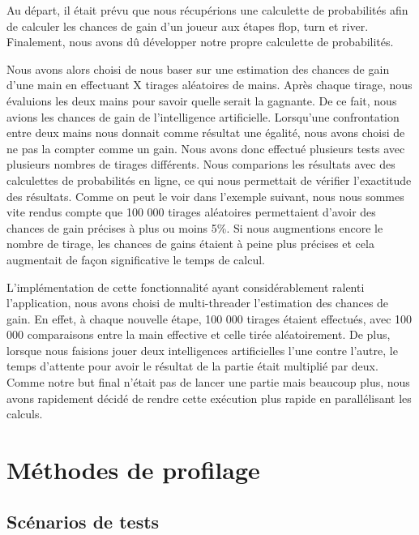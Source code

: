 \documentclass{report}
\begin{document}
Au départ, il était prévu que nous récupérions une calculette de probabilités afin de calculer les chances de gain d'un joueur aux étapes flop, turn et river. Finalement, nous avons dû développer notre propre calculette de probabilités.\par
Nous avons alors choisi de nous baser sur une estimation des chances de gain d'une main en effectuant X tirages aléatoires de mains. Après chaque tirage, nous évaluions les deux mains pour savoir quelle serait la gagnante. De ce fait, nous avions les chances de gain de l'intelligence artificielle. Lorsqu'une confrontation entre deux mains nous donnait comme résultat une égalité, nous avons choisi de ne pas la compter comme un gain.
Nous avons donc effectué plusieurs tests avec plusieurs nombres de tirages différents. Nous comparions les résultats avec des calculettes de probabilités en ligne, ce qui nous permettait de vérifier l'exactitude des résultats.
Comme on peut le voir dans l'exemple suivant, nous nous sommes vite rendus compte que 100 000 tirages aléatoires permettaient d'avoir des chances de gain précises à plus ou moins 5\%. Si nous augmentions encore le nombre de tirage, les chances de gains étaient à peine plus précises et cela augmentait de façon significative le temps de calcul.


L'implémentation de cette fonctionnalité ayant considérablement ralenti l'application, nous avons choisi de multi-threader l'estimation des chances de gain. En effet, à chaque nouvelle étape, 100 000 tirages étaient effectués, avec 100 000 comparaisons entre la main effective et celle tirée aléatoirement. De plus, lorsque nous faisions jouer deux intelligences artificielles l'une contre l'autre, le temps d'attente pour avoir le résultat de la partie était multiplié par deux. Comme notre but final n'était pas de lancer une partie mais beaucoup plus, nous avons rapidement décidé de rendre cette exécution plus rapide en parallélisant les calculs.

\chapter{Méthodes de profilage}

\section{Scénarios de tests}
\end{document}

